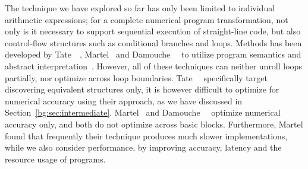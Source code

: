 The technique we have explored so far has only been limited to individual
arithmetic expressions; for a complete numerical program transformation, not
only is it necessary to support sequential execution of straight-line code,
but also control-flow structures such as conditional branches and loops.
Methods has been developed by Tate~\etal~\cite{tate09}, Martel~\cite{martel09}
and Damouche~\etal~\cite{damouche15} to utilize program semantics and
abstract interpretation~\cite{cousot77}.  However, all of these techniques
can neither unroll loops partially, nor optimize across loop boundaries.
Tate~\etal~\cite{tate09} specifically target discovering equivalent structures
only, it is however difficult to optimize for numerical accuracy using
their approach, as we have discussed in Section~\ref{bg:sec:intermediate}.
Martel~\cite{martel09} and Damouche~\etal~\cite{damouche15} optimize
numerical accuracy only, and both do not optimize across basic blocks.
Furthermore, Martel found that frequently their technique produces much slower
implementations, while we also consider performance, by improving accuracy,
latency and the resource usage of programs.

